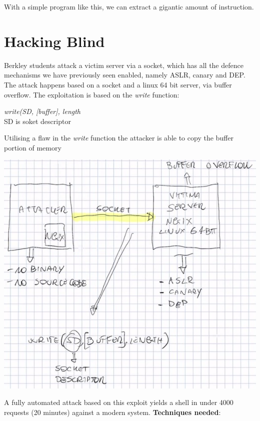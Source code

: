 \documentclass[11pt, oneside]{article}   	%
\begin{document}
With a simple program like this, we can extract a gigantic amount of instruction.
\section*{Hacking Blind}
Berkley students attack a victim server via a socket, which has all the defence mechanisms we have previously seen enabled, namely ASLR, canary and DEP. The attack happens based on a socket and a linux 64 bit server, via buffer overflow. The exploitation is based on the \emph{write} function:\begin{center}
\emph{write(SD, [buffer], length}\\
SD is soket descriptor
\end{center}
Utilising a flaw in the \emph{write} function the attacker is able to copy the buffer portion of memory
\begin{center}
\includegraphics[scale = 0.5]{socket}
\end{center}
A fully automated attack based on this exploit yields a shell in under 4000 requests (20 minutes) against a modern system. \textbf{Techniques needed}:
\end{document}

